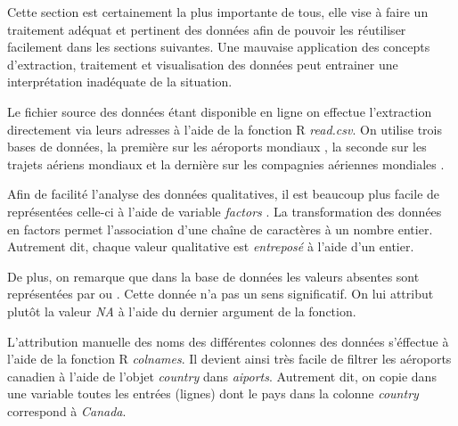 \documentclass{report}
\begin{document}
Cette section est certainement la plus importante de tous, elle vise à faire un traitement adéquat et pertinent des données afin de pouvoir les réutiliser facilement dans les sections suivantes. Une mauvaise application des concepts d’extraction, traitement et visualisation des données peut entrainer une interprétation inadéquate de la situation.

Le fichier source des données étant disponible en ligne on effectue l'extraction directement via leurs adresses à l'aide de la fonction R \textit{read.csv}. On utilise trois bases de données, la première sur les aéroports mondiaux \cite{Data:AirportWorlwide}, la seconde sur les trajets aériens mondiaux \cite{Data:RouteWorlwide} et la dernière sur les compagnies aériennes mondiales \cite{Data:AirlineWorldwide}.

Afin de facilité l'analyse des données qualitatives, il est beaucoup plus facile de représentées celle-ci à l'aide de variable \textit{factors} \cite{Rfunction:as.factor}. La transformation des données en factors permet l'association d'une chaîne de caractères à un nombre entier. Autrement dit, chaque valeur qualitative est \emph{entreposé} à l'aide d'un entier.

De plus, on remarque que dans la base de données les valeurs absentes sont représentées par  ou . Cette donnée n'a pas un sens significatif. On lui attribut plutôt la valeur \textit{NA} à l'aide du dernier argument de la fonction.

L'attribution manuelle des noms des différentes colonnes des données s'éffectue à l'aide de la fonction R \textit{colnames}. Il devient ainsi très facile de filtrer les aéroports canadien à l'aide de l'objet \emph{country} dans \emph{aiports}. Autrement dit, on copie dans une variable toutes les entrées (lignes) dont le pays dans la colonne \emph{country} correspond à \emph{Canada}.
%
%
\end{document}
